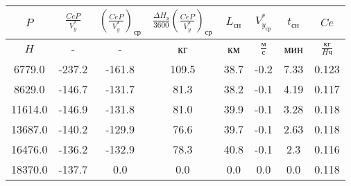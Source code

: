 \begin{tabular}{|c|c|c|c|c|c|c|c|}
\hline
$P$ & $\frac{CeP}{V_y^*}$ & $(\frac{CeP}{V_y^*})_{ср}$ & $\frac{\Delta H_э}{3600}(\frac{CeP}{V_y^*})_{ср}$ & $L_{сн}$ & $V_{y_{ср}}^*$ & $t_{сн}$ & $Ce$ \\ 
\hline
$H$ & - & - & кг & км & $\frac{м}{с}$ & мин & $\frac{кг}{H ч}$ \\ 
\hline
6779.0 & -237.2 & -161.8 & 109.5 & 38.7 & -0.2 & 7.33 & 0.123 \\ 
\hline
8629.0 & -146.7 & -131.7 & 81.3 & 38.2 & -0.1 & 4.19 & 0.117 \\ 
\hline
11614.0 & -146.9 & -131.8 & 81.0 & 39.9 & -0.1 & 3.28 & 0.118 \\ 
\hline
13687.0 & -140.2 & -129.9 & 76.6 & 39.7 & -0.1 & 2.63 & 0.118 \\ 
\hline
16476.0 & -136.2 & -132.9 & 78.3 & 40.8 & -0.1 & 2.3 & 0.116 \\ 
\hline
18370.0 & -137.7 & 0.0 & 0.0 & 0.0 & 0.0 & 0.0 & 0.118 \\ 
\hline
\end{tabular}